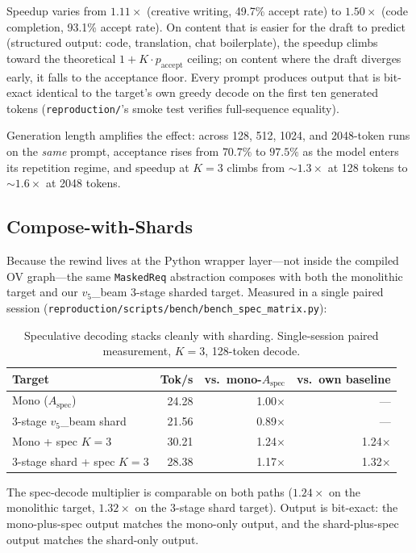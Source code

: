 \documentclass[11pt]{article}
\newcommand{\brk}{\discretionary{}{}{}}
\begin{document}
Speedup varies from $1.11\times$ (creative writing, 49.7\% accept rate) to $1.50\times$ (code completion, 93.1\% accept rate). On content that is easier for the draft to predict (structured output: code, translation, chat boilerplate), the speedup climbs toward the theoretical $1\!+\!K\!\cdot\!p_\text{accept}$ ceiling; on content where the draft diverges early, it falls to the acceptance floor. Every prompt produces output that is bit-exact identical to the target's own greedy decode on the first ten generated tokens (\texttt{reproduction/}'s smoke test verifies full-sequence equality).

Generation length amplifies the effect: across 128, 512, 1024, and 2048-token runs on the \emph{same} prompt, acceptance rises from $70.7\%$ to $97.5\%$ as the model enters its repetition regime, and speedup at $K\!=\!3$ climbs from $\sim 1.3\times$ at 128 tokens to $\sim 1.6\times$ at 2048 tokens.

\subsection{Compose-with-Shards}

Because the rewind lives at the Python wrapper layer---not inside the compiled OV graph---the same \texttt{MaskedReq} abstraction composes with both the monolithic target and our $v_5$\_beam 3-stage sharded target. Measured in a single paired session (\texttt{reproduction/\brk scripts/\brk bench/\brk bench\_\brk spec\_\brk matrix.py}):

\begin{table}[ht]
\centering
\caption{Speculative decoding stacks cleanly with sharding. Single-session paired measurement, $K\!=\!3$, 128-token decode.}
\label{tab:spec_shard}
\begin{tabular}{@{}lrrr@{}}
\toprule
Target & Tok/s & vs.\ mono-$A_{\text{spec}}$ & vs.\ own baseline \\
\midrule
Mono ($A_{\text{spec}}$) & 24.28 & 1.00$\times$ & --- \\
3-stage $v_5$\_beam shard & 21.56 & 0.89$\times$ & --- \\
Mono + spec $K\!=\!3$ & 30.21 & 1.24$\times$ & 1.24$\times$ \\
3-stage shard + spec $K\!=\!3$ & 28.38 & 1.17$\times$ & 1.32$\times$ \\
\bottomrule
\end{tabular}
\end{table}

The spec-decode multiplier is comparable on both paths ($1.24\times$ on the monolithic target, $1.32\times$ on the 3-stage shard target). Output is bit-exact: the mono-plus-spec output matches the mono-only output, and the shard-plus-spec output matches the shard-only output.
\end{document}
